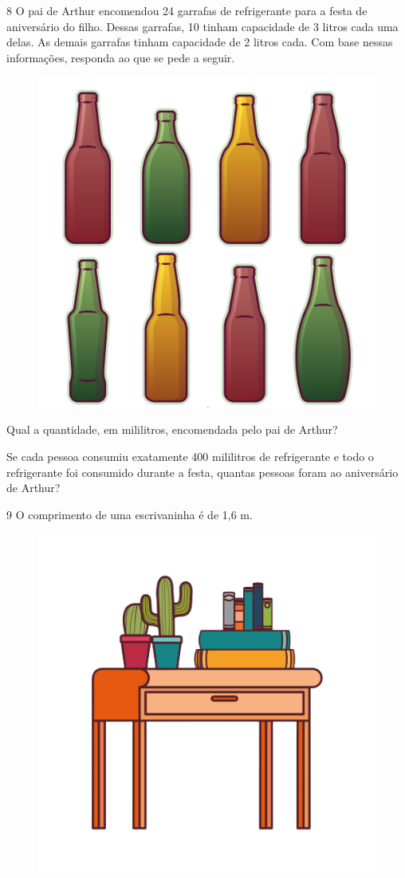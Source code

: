 \num{8} O pai de Arthur encomendou 24 garrafas de
refrigerante para a festa de aniversário do filho. Dessas garrafas, 10 tinham capacidade de 3 litros cada uma delas. As demais garrafas tinham capacidade de 2 litros cada. Com base nessas
informações, responda ao que se pede a seguir.

\begin{figure}[htpb!]
\centering
\includegraphics[width=.6\textwidth]{./media/image47a.png}
\end{figure}

\begin{escolha}
\item Qual a quantidade, em mililitros, encomendada pelo pai de Arthur?\\

\item Se cada pessoa consumiu exatamente 400 mililitros de refrigerante e
  todo o refrigerante foi consumido durante a festa, quantas pessoas
  foram ao aniversário de Arthur?\\
\end{escolha}

\num{9} O comprimento de uma escrivaninha é de 1,6 m. 

\begin{figure}[htpb!]
\centering
\includegraphics[width=.3\textwidth]{./media/image47b.png}
\end{figure}


